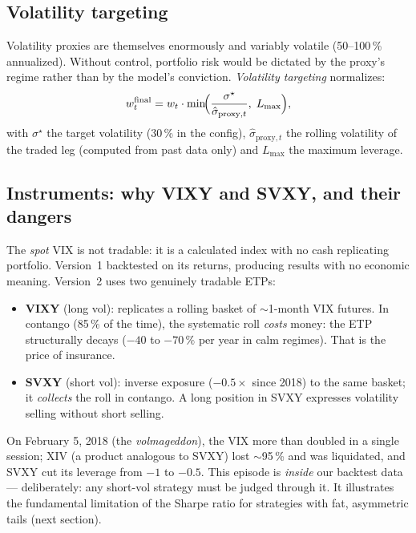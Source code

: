 \documentclass[11pt,a4paper]{article}
\begin{document}
\subsection{Volatility targeting}

Volatility proxies are themselves enormously and variably volatile
(50--100\,\% annualized). Without control, portfolio risk would be dictated
by the proxy's regime rather than by the model's conviction.
\emph{Volatility targeting} normalizes:
\begin{equation}
w_t^{\text{final}} = w_t \cdot
\min\!\Bigl(\frac{\sigma^\star}{\hat{\sigma}_{\text{proxy},t}},\; L_{\max}\Bigr),
\end{equation}
with $\sigma^\star$ the target volatility (30\,\% in the config),
$\hat{\sigma}_{\text{proxy},t}$ the rolling volatility of the traded leg
(computed from past data only) and $L_{\max}$ the maximum leverage.

\subsection{Instruments: why VIXY and SVXY, and their dangers}

The \emph{spot} VIX is not tradable: it is a calculated index with no cash
replicating portfolio. Version~1 backtested on its returns, producing results
with no economic meaning. Version~2 uses two genuinely tradable ETPs:
\begin{itemize}
\item \textbf{VIXY} (long vol): replicates a rolling basket of
  $\sim$1-month VIX futures. In contango (85\,\% of the time), the
  systematic roll \emph{costs} money: the ETP structurally decays ($-40$ to
  $-70\,\%$ per year in calm regimes). That is the price of insurance.
\item \textbf{SVXY} (short vol): inverse exposure ($-0.5\times$ since 2018)
  to the same basket; it \emph{collects} the roll in contango. A long
  position in SVXY expresses volatility selling without short selling.
\end{itemize}
On February 5, 2018 (the \emph{volmageddon}), the VIX more than doubled in a
single session; XIV (a product analogous to SVXY) lost $\sim$95\,\% and was
liquidated, and SVXY cut its leverage from $-1$ to $-0.5$. This episode is
\emph{inside} our backtest data --- deliberately: any short-vol strategy must
be judged through it. It illustrates the fundamental limitation of the Sharpe
ratio for strategies with fat, asymmetric tails (next section).
\end{document}
